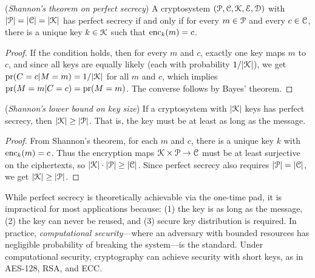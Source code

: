 \documentclass[a4paper, 12pt]{book} %
\begin{document}
\begin{theorem}
    (\emph{Shannon's theorem on perfect secrecy})  A cryptosystem $(\EuScript{P}, \EuScript{C}, \EuScript{K}, \EuScript{E}, \EuScript{D})$ with $|\EuScript{P}| = |\EuScript{C}| = |\EuScript{K}|$ has perfect secrecy if and only if for every $m \in \EuScript{P}$ and every $c \in \EuScript{C}$, there is a unique key $k \in \EuScript{K}$ such that $\mathrm{enc}_k(m) = c$.
\end{theorem}

\begin{proof}
    If the condition holds, then for every $m$ and $c$, exactly one key maps $m$ to $c$, and since all keys are equally likely (each with probability $1/|\EuScript{K}|$), we get $\operatorname{pr}(C = c | M = m) = 1/|\EuScript{K}|$ for all $m$ and $c$, which implies $\operatorname{pr}(M = m | C = c) = \operatorname{pr}(M = m)$. The converse follows by Bayes' theorem.
\end{proof}

\begin{theorem}
    (\emph{Shannon's lower bound on key size}) If a cryptosystem with $|\EuScript{K}|$ keys has perfect secrecy, then $|\EuScript{K}| \geq |\EuScript{P}|$. That is, the key must be at least as long as the message.
\end{theorem}

\begin{proof}
    From Shannon's theorem, for each $m$ and $c$, there is a unique key $k$ with $\mathrm{enc}_k(m) = c$. Thus the encryption maps $\EuScript{K} \times \EuScript{P} \to \EuScript{C}$ must be at least surjective on the ciphertexts, so $|\EuScript{K}| \cdot |\EuScript{P}| \geq |\EuScript{C}|$. Since perfect secrecy also requires $|\EuScript{P}| = |\EuScript{C}|$, we get $|\EuScript{K}| \geq |\EuScript{P}|$.
\end{proof}

\begin{remark}
    While perfect secrecy is theoretically achievable via the one-time pad, it is impractical for most applications because: (1) the key is as long as the message, (2) the key can never be reused, and (3) secure key distribution is required. In practice, \emph{computational security}---where an adversary with bounded resources has negligible probability of breaking the system---is the standard. Under computational security, cryptography can achieve security with short keys, as in AES-128, RSA, and ECC.
\end{remark}
\end{document}
